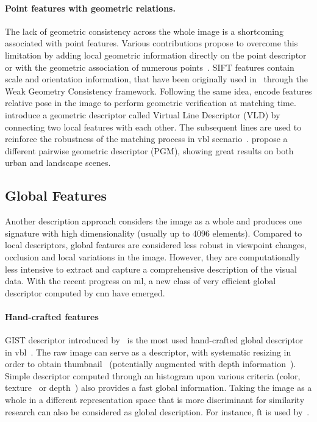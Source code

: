 		\paragraph{Point features with geometric relations.}
        	The lack of geometric consistency across the whole image is a shortcoming associated with point features. Various contributions propose to overcome this limitation by adding local geometric information directly on the point descriptor~\citep{Baatz2012,Jegou2008} or with the geometric association of numerous points~\citep{Liu2012,Li2015}. SIFT features contain scale and orientation information, that have been originally used in~\citep{Jegou2008} through the Weak Geometry Consistency framework. Following the same idea, \citet{Baatz2012} encode features relative pose in the image to perform geometric verification at matching time. \citet{Liu2012} introduce a geometric descriptor called Virtual Line Descriptor (VLD) by connecting two local features with each other. The subsequent lines are used to reinforce the robustness of the matching process in \ac{vbl} scenario~\citep{Majdik2013}. \citet{Li2015} propose a different pairwise geometric descriptor (PGM), showing great results on both urban and landscape scenes.
			
	\subsection{Global Features}
	\label{subsec:global_feature}
		Another description approach considers the image as a whole and produces one signature with high dimensionality (usually up to 4096 elements). Compared to local descriptors, global features are considered less robust in viewpoint changes, occlusion and local variations in the image. However, they are computationally less intensive to extract and capture a comprehensive description of the visual data. With the recent progress on \ac{ml}, a new class of very efficient global descriptor computed by \ac{cnn} have emerged.
		
		\paragraph{Hand-crafted features}
		 	GIST descriptor introduced by~\citet{Oliva2001} is the most used hand-crafted global descriptor in \ac{vbl}~\citep{Russell2011,Azzi2016,Hays2008}. The raw image can serve as a descriptor, with systematic resizing in order to obtain thumbnail~\citep{Hays2008,Corke2013} (potentially augmented with depth information~\citep{Gee2012}). Simple descriptor computed through an histogram upon various criteria (color, texture~\citep{Hays2008} or depth~\citep{Ni2009}) also provides a fast global information. Taking the image as a whole in a different representation space that is more discriminant for similarity research can also be considered as global description. For instance, \ac{ft} is used by~\citet{Wan2016}.
			
